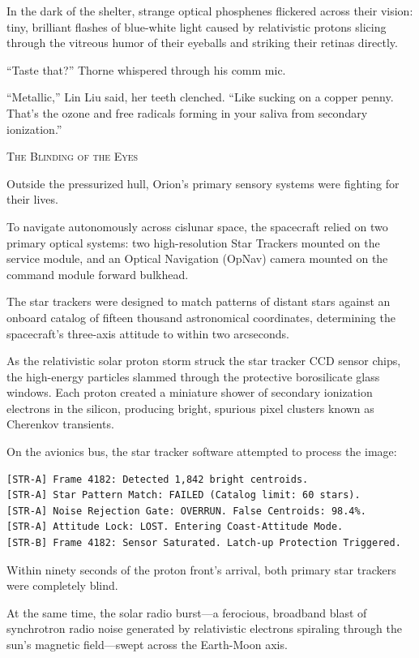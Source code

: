 \documentclass[12pt,twoside,openright]{book}
\newcommand{\sceneheader}[1]{%
  \par\vspace{1.8em}%
  {\noindent\centering\scshape\large #1\par}%
  \vspace{1.0em}%
  \noindent%
}
\newcommand{\dinkus}{%
  \par\vspace{1.2em}%
  {\noindent\centering{\large $\ast\quad\ast\quad\ast$}\par}%
  \vspace{1.2em}%
  \noindent%
}
\begin{document}
In the dark of the shelter, strange optical phosphenes flickered across
their vision: tiny, brilliant flashes of blue-white light caused by
relativistic protons slicing through the vitreous humor of their
eyeballs and striking their retinas directly.

``Taste that?'' Thorne whispered through his comm mic.

``Metallic,'' Lin Liu said, her teeth clenched. ``Like sucking on a
copper penny. That's the ozone and free radicals forming in your saliva
from secondary ionization.''

\dinkus

\sceneheader{The Blinding of the Eyes}

Outside the pressurized hull, Orion's primary sensory systems were
fighting for their lives.

To navigate autonomously across cislunar space, the spacecraft relied on
two primary optical systems: two high-resolution Star Trackers mounted
on the service module, and an Optical Navigation (OpNav) camera mounted
on the command module forward bulkhead.

The star trackers were designed to match patterns of distant stars
against an onboard catalog of fifteen thousand astronomical coordinates,
determining the spacecraft's three-axis attitude to within two
arcseconds.

As the relativistic solar proton storm struck the star tracker CCD
sensor chips, the high-energy particles slammed through the protective
borosilicate glass windows. Each proton created a miniature shower of
secondary ionization electrons in the silicon, producing bright,
spurious pixel clusters known as Cherenkov transients.

On the avionics bus, the star tracker software attempted to process the
image:

\begin{lstlisting}
[STR-A] Frame 4182: Detected 1,842 bright centroids.
[STR-A] Star Pattern Match: FAILED (Catalog limit: 60 stars).
[STR-A] Noise Rejection Gate: OVERRUN. False Centroids: 98.4%.
[STR-A] Attitude Lock: LOST. Entering Coast-Attitude Mode.
[STR-B] Frame 4182: Sensor Saturated. Latch-up Protection Triggered.
\end{lstlisting}

Within ninety seconds of the proton front's arrival, both primary star
trackers were completely blind.

At the same time, the solar radio burst---a ferocious, broadband blast
of synchrotron radio noise generated by relativistic electrons spiraling
through the sun's magnetic field---swept across the Earth-Moon axis.
\end{document}
